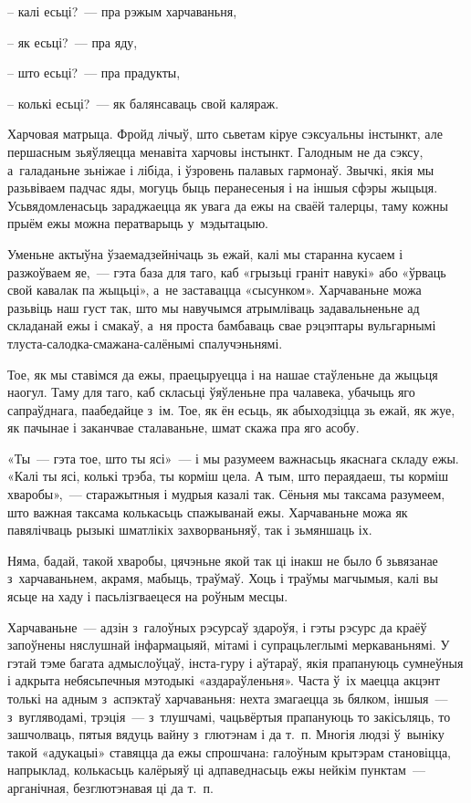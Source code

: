 – калі есьці?~--- пра рэжым харчаваньня,

– як есьці?~--- пра яду,

– што есьці?~--- пра прадукты,

– колькі есьці?~--- як балянсаваць свой каляраж.

Харчовая матрыца. Фройд лічыў, што сьветам кіруе сэксуальны інстынкт, але першасным зьяўляецца менавіта харчовы інстынкт. Галодным не да сэксу, а~галаданьне зьніжае і лібіда, і ўзровень палавых гармонаў. Звычкі, якія мы разьвіваем падчас яды, могуць быць перанесеныя і на іншыя сфэры жыцьця. Усьвядомленасьць зараджаецца як увага да ежы на сваёй талерцы, таму кожны прыём ежы можна ператварыць у~мэдытацыю.

Уменьне актыўна ўзаемадзейнічаць зь ежай, калі мы старанна кусаем і разжоўваем яе,~--- гэта база для таго, каб «грызьці граніт навукі» або «ўрваць свой кавалак па жыцьці», а~не заставацца «сысунком». Харчаваньне можа разьвіць наш густ так, што мы навучымся атрымліваць задавальненьне ад складанай ежы і смакаў, а~ня проста бамбаваць свае рэцэптары вульгарнымі тлуста-салодка-смажана-салёнымі спалучэньнямі.

Тое, як мы ставімся да ежы, праецыруецца і на нашае стаўленьне да жыцьця наогул. Таму для таго, каб скласьці ўяўленьне пра чалавека, убачыць яго сапраўднага, паабедайце з~ім. Тое, як ён есьць, як абыходзіцца зь ежай, як жуе, як пачынае і заканчвае сталаваньне, шмат скажа пра яго асобу.

«Ты~--- гэта тое, што ты ясі»~--- і мы разумеем важнасьць якаснага складу ежы. «Калі ты ясі, колькі трэба, ты корміш цела. А тым, што пераядаеш, ты корміш хваробы»,~--- старажытныя і мудрыя казалі так. Сёньня мы таксама разумеем, што важная таксама колькасьць спажыванай ежы. Харчаваньне можа як павялічваць рызыкі шматлікіх захворваньняў, так і зьмяншаць іх.

Няма, бадай, такой хваробы, цячэньне якой так ці інакш не было б зьвязанае з~харчаваньнем, акрамя, мабыць, траўмаў. Хоць і траўмы магчымыя, калі вы ясьце на хаду і пасьлізгваецеся на роўным месцы.

Харчаваньне~--- адзін з~галоўных рэсурсаў здароўя, і гэты рэсурс да краёў запоўнены няслушнай інфармацыяй, мітамі і супрацьлеглымі меркаваньнямі. У гэтай тэме багата адмыслоўцаў, інста-гуру і аўтараў, якія прапануюць сумнеўныя і адкрыта небясьпечныя мэтодыкі «аздараўленьня». Часта ў~іх маецца акцэнт толькі на адным з~аспэктаў харчаваньня: нехта змагаецца зь бялком, іншыя~--- з~вугляводамі, трэція~--- з~тлушчамі, чацьвёртыя прапануюць то закісьляць, то зашчолваць, пятыя вядуць вайну з~глютэнам і да т.~п. Многія людзі ў~выніку такой «адукацыі» ставяцца да ежы спрошчана: галоўным крытэрам становіцца, напрыклад, колькасьць калёрыяў ці адпаведнасьць ежы нейкім пунктам~--- арганічная, безглютэнавая ці да т.~п.

